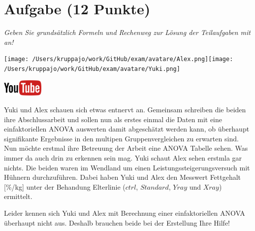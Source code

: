 \documentclass[a4paper, 9pt]{scrartcl}\usepackage[]{graphicx}\usepackage[]{xcolor}
\begin{document}
 
\clearpage

\section{Aufgabe \hfill (12 Punkte)}

\textit{Geben Sie grundsätzlich Formeln und Rechenweg zur Lösung der Teilaufgaben mit an!} \\[1Ex]
 

 
\begin{minipage}[t]{0.5\textwidth}
\texttt{[image: /Users/kruppajo/work/GitHub/exam/avatare/Alex.png]}\hspace{-4mm}\texttt{[image: /Users/kruppajo/work/GitHub/exam/avatare/Yuki.png]}
\end{minipage}
\begin{minipage}[t]{0.5\textwidth}
\hfill
\href{https://youtu.be/49hvImMwVyE}{\includegraphics[width = 2cm]{img/youtube}}
\end{minipage}
\vspace{1ex}



Yuki und Alex schauen sich etwas entnervt an. Gemeinsam schreiben die beiden ihre Abschlussarbeit und sollen nun als erstes einmal die Daten mit eine einfaktoriellen ANOVA auswerten damit abgeschätzt werden kann, ob überhaupt signifikante Ergebnisse in den multipen Gruppenvergleichen zu erwarten sind. Nun möchte erstmal ihre Betreuung der Arbeit eine ANOVA Tabelle sehen. Was immer da auch drin zu erkennen sein mag. Yuki schaut Alex sehen erstmla gar nichts. Die beiden waren im Wendland um einen Leistungssteigerungsversuch mit Hühnern durchzuführen. Dabei haben Yuki und Alex den Messwert Fettgehalt [\%/kg] unter der Behandung Elterlinie ($ctrl$, $Standard$, $Yray$ und $Xray$) ermittelt.



\vspace{1ex}

Leider kennen sich Yuki und Alex mit Berechnung einer einfaktoriellen ANOVA überhaupt nicht aus. Deshalb brauchen beide bei der Erstellung Ihre Hilfe! 
\end{document}
